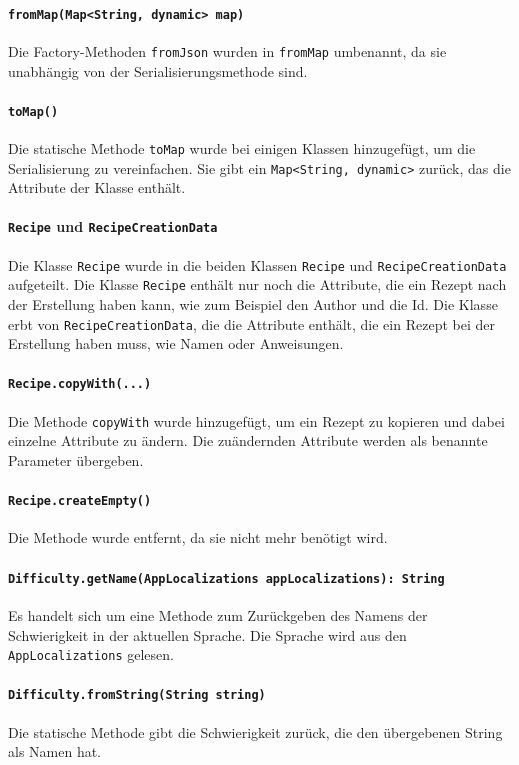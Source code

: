 \documentclass{implementierungsheft}
\begin{document}
\paragraph*{\texttt{fromMap(Map<String, dynamic> map)}} Die Factory-Methoden \texttt{fromJson} wurden in \texttt{fromMap} umbenannt, da sie unabhängig von der Serialisierungsmethode sind.
\paragraph*{\texttt{toMap()}} Die statische Methode \texttt{toMap} wurde bei einigen Klassen hinzugefügt, um die Serialisierung zu vereinfachen. Sie gibt ein \texttt{Map<String, dynamic>} zurück, das die Attribute der Klasse enthält.
\paragraph{\texttt{Recipe} und \texttt{RecipeCreationData}}
Die Klasse \texttt{Recipe} wurde in die beiden Klassen \texttt{Recipe} und \texttt{RecipeCreationData} aufgeteilt. Die Klasse \texttt{Recipe} enthält nur noch die Attribute, die ein Rezept nach der Erstellung haben kann, wie zum Beispiel den Author und die Id. Die Klasse erbt von \texttt{RecipeCreationData}, die die Attribute enthält, die ein Rezept bei der Erstellung haben muss, wie Namen oder Anweisungen.
\paragraph{\texttt{Recipe.copyWith(...)}} Die Methode \texttt{copyWith} wurde hinzugefügt, um ein Rezept zu kopieren und dabei einzelne Attribute zu ändern. Die zuändernden Attribute werden als benannte Parameter übergeben.
\paragraph{\texttt{Recipe.createEmpty()}} Die Methode wurde entfernt, da sie nicht mehr benötigt wird.
\paragraph{\texttt{Difficulty.getName(AppLocalizations appLocalizations): String}}
Es handelt sich um eine Methode zum Zurückgeben des Namens der Schwierigkeit in der aktuellen Sprache. Die Sprache wird aus den \texttt{AppLocaliza\-tions} gelesen.
\paragraph{\texttt{Difficulty.fromString(String string)}}
Die statische Methode gibt die Schwierigkeit zurück, die den übergebenen String als Namen hat.
\end{document}
